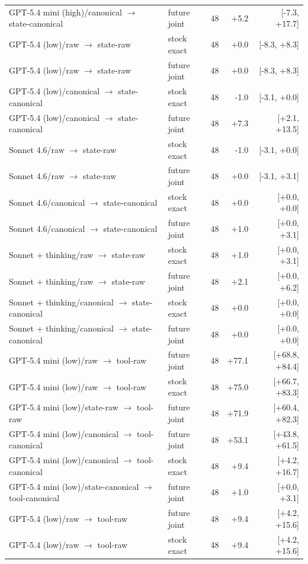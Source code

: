 \begin{table}[htbp]
{\begin{tabular}{lllrr}
GPT-5.4 mini (high)/canonical $\to$ state-canonical & future joint & 48 & +5.2 & [-7.3, +17.7] \\
GPT-5.4 (low)/raw $\to$ state-raw & stock exact & 48 & +0.0 & [-8.3, +8.3] \\
GPT-5.4 (low)/raw $\to$ state-raw & future joint & 48 & +0.0 & [-8.3, +8.3] \\
GPT-5.4 (low)/canonical $\to$ state-canonical & stock exact & 48 & -1.0 & [-3.1, +0.0] \\
GPT-5.4 (low)/canonical $\to$ state-canonical & future joint & 48 & +7.3 & [+2.1, +13.5] \\
Sonnet 4.6/raw $\to$ state-raw & stock exact & 48 & -1.0 & [-3.1, +0.0] \\
Sonnet 4.6/raw $\to$ state-raw & future joint & 48 & +0.0 & [-3.1, +3.1] \\
Sonnet 4.6/canonical $\to$ state-canonical & stock exact & 48 & +0.0 & [+0.0, +0.0] \\
Sonnet 4.6/canonical $\to$ state-canonical & future joint & 48 & +1.0 & [+0.0, +3.1] \\
Sonnet + thinking/raw $\to$ state-raw & stock exact & 48 & +1.0 & [+0.0, +3.1] \\
Sonnet + thinking/raw $\to$ state-raw & future joint & 48 & +2.1 & [+0.0, +6.2] \\
Sonnet + thinking/canonical $\to$ state-canonical & stock exact & 48 & +0.0 & [+0.0, +0.0] \\
Sonnet + thinking/canonical $\to$ state-canonical & future joint & 48 & +0.0 & [+0.0, +0.0] \\
GPT-5.4 mini (low)/raw $\to$ tool-raw & future joint & 48 & +77.1 & [+68.8, +84.4] \\
GPT-5.4 mini (low)/raw $\to$ tool-raw & stock exact & 48 & +75.0 & [+66.7, +83.3] \\
GPT-5.4 mini (low)/state-raw $\to$ tool-raw & future joint & 48 & +71.9 & [+60.4, +82.3] \\
GPT-5.4 mini (low)/canonical $\to$ tool-canonical & future joint & 48 & +53.1 & [+43.8, +61.5] \\
GPT-5.4 mini (low)/canonical $\to$ tool-canonical & stock exact & 48 & +9.4 & [+4.2, +16.7] \\
GPT-5.4 mini (low)/state-canonical $\to$ tool-canonical & future joint & 48 & +1.0 & [+0.0, +3.1] \\
GPT-5.4 (low)/raw $\to$ tool-raw & future joint & 48 & +9.4 & [+4.2, +15.6] \\
GPT-5.4 (low)/raw $\to$ tool-raw & stock exact & 48 & +9.4 & [+4.2, +15.6] \\

\end{tabular}}
\end{table}
